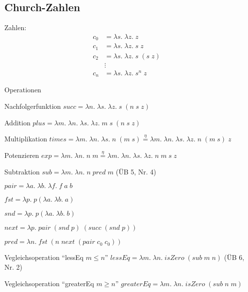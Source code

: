 \subsection{Church-Zahlen }
\begin{compactitem}
	\item Zahlen:
		\begin{align*}
			c_0 &= \lambda s.\; \lambda z.\; z\\
			c_1 &= \lambda s.\; \lambda z.\; s\; z\\
			c_2 &= \lambda s.\; \lambda z.\; s\; (s\; z)\\
				& \vdots \\
			c_n &= \lambda s.\; \lambda z.\; s^n\; z
		\end{align*}
	\item Operationen
		\begin{compactitem}
			\item Nachfolgerfunktion $succ = \lambda n.\; \lambda s.\; \lambda z.\; s\; (n\; s\; z)$
			\item Addition $plus = \lambda m.\; \lambda n.\; \lambda s.\; \lambda z.\; m\; s\; (n\; s\; z)$
			\item Multiplikation $times = \lambda m.\; \lambda n.\; \lambda s.\; n\; (m\; s) \overset{\eta}{=} \lambda m.\; \lambda n.\; \lambda s.\; \lambda z.\; n\; (m\; s)\; z$
			\item Potenzieren $exp = \lambda m.\; \lambda n.\; n\; m \overset{\eta}{=} \lambda m.\; \lambda n.\; \lambda s. \; \lambda z.\; n\; m\; s\; z$
			\item Subtraktion $sub = \lambda m.\; \lambda n.\; n\; pred\; m$ (ÜB 5, Nr. 4)
				\begin{compactitem}
					\item $pair = \lambda a.\; \lambda b.\; \lambda f.\; f\; a\; b$
					\item $fst = \lambda p.\; p (\lambda a.\; \lambda b.\; a)$
					\item $snd = \lambda p.\; p (\lambda a.\; \lambda b.\; b)$
					\item $next = \lambda p.\; pair\; (snd\; p)\; (succ\; (snd\; p))$
					\item $pred = \lambda n.\; fst\; (n\; next\; (pair\; c_0\; c_0))$
				\end{compactitem}
			\item Vegleichsoperation \enquote{lessEq $m \leq n$} $lessEq = \lambda m.\; \lambda n.\; isZero\; (sub\; m\; n)$ (ÜB 6, Nr. 2)
			\item Vegleichsoperation \enquote{greaterEq $m \geq n$} $greaterEq = \lambda m.\; \lambda n.\; isZero\; (sub\; n\; m)$

\end{compactitem}
\end{compactitem}

